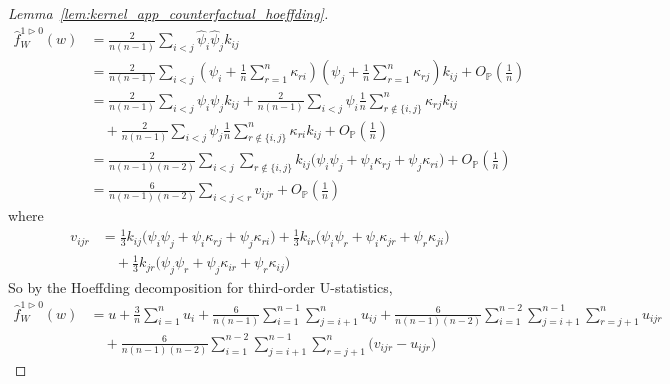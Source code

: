 \documentclass[11pt,lof]{puthesis}
\renewcommand{\P}{\ensuremath{\mathbb{P}}}
\theoremstyle{break}
\theoremstyle{proof}
\newtheorem{proof}{Proof}
\begin{document}
\begin{proof}[Lemma~\ref{lem:kernel_app_counterfactual_hoeffding}]
  \begin{align*}
    \hat f_W^{1 \triangleright 0}(w)
    &=
    \frac{2}{n(n-1)}
    \sum_{i < j}
    \hat \psi_i
    \hat \psi_j
    k_{i j} \\
    &=
    \frac{2}{n(n-1)}
    \sum_{i < j}
    \left(
      \psi_i
      + \frac{1}{n}
      \sum_{r=1}^n \kappa_{r i}
    \right)
    \left(
      \psi_j
      + \frac{1}{n}
      \sum_{r=1}^n \kappa_{r j}
    \right)
    k_{i j}
    + O_\P\left(\frac{1}{n}\right) \\
    &=
    \frac{2}{n(n-1)}
    \sum_{i < j}
    \psi_i
    \psi_j
    k_{i j}
    + \frac{2}{n(n-1)}
    \sum_{i < j}
    \psi_i
    \frac{1}{n}
    \sum_{r \notin \{i,j\}}^n \kappa_{r j}
    k_{i j} \\
    &\quad+
    \frac{2}{n(n-1)}
    \sum_{i < j}
    \psi_j
    \frac{1}{n}
    \sum_{r \notin \{i,j\}}^n \kappa_{r i}
    k_{i j}
    + O_\P\left(\frac{1}{n}\right) \\
    &=
    \frac{2}{n(n-1)(n-2)}
    \sum_{i < j}
    \sum_{r \notin \{i,j\}}
    k_{i j}
    \Big(
      \psi_i
      \psi_j
      +\psi_i
      \kappa_{r j}
      +\psi_j
      \kappa_{r i}
    \Big)
    + O_\P\left(\frac{1}{n}\right) \\
    &=
    \frac{6}{n(n-1)(n-2)}
    \sum_{i < j < r}
    v_{i j r}
    + O_\P\left(\frac{1}{n}\right)
  \end{align*}
  where
  \begin{align*}
    v_{i j r}
    &=
    \frac{1}{3}
    k_{i j} \Big(\psi_i \psi_j +\psi_i \kappa_{r j} +\psi_j \kappa_{r i} \Big)
    + \frac{1}{3}
    k_{i r} \Big(\psi_i \psi_r +\psi_i \kappa_{jr} +\psi_r \kappa_{j i} \Big) \\
    &\quad+
    \frac{1}{3}
    k_{jr} \Big(\psi_j \psi_r +\psi_j \kappa_{i r} +\psi_r \kappa_{i j} \Big)
  \end{align*}
  So by the Hoeffding decomposition for third-order U-statistics,
  \begin{align*}
    \hat f_W^{1 \triangleright 0}(w)
    &=
    u + \frac{3}{n}
    \sum_{i=1}^n
    u_i
    + \frac{6}{n(n-1)}
    \sum_{i=1}^{n-1}
    \sum_{j=i+1}^n
    u_{i j}
    + \frac{6}{n(n-1)(n-2)}
    \sum_{i=1}^{n-2}
    \sum_{j=i+1}^{n-1}
    \sum_{r=j+1}^n
    u_{i j r} \\
    &\quad+
    \frac{6}{n(n-1)(n-2)}
    \sum_{i=1}^{n-2}
    \sum_{j=i+1}^{n-1}
    \sum_{r=j+1}^n
    \big(v_{i j r} - u_{i j r}\big)

\end{align*}
\end{proof}
\end{document}
